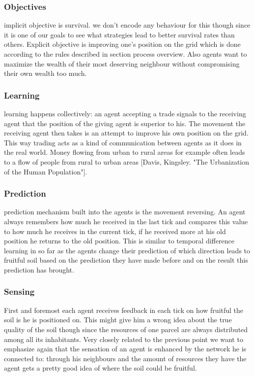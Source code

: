 \documentclass{JASSS}
\begin{document}
\subsubsection{Objectives}
	implicit objective is survival. we don't encode any behaviour for this though since it is one of our goals to see what strategies lead to better survival rates than others. Explicit objective is improving one's position on the grid which is done according to the rules described in section process overview. Also agents want to maximize the wealth of their most deserving neighbour without compromising their own wealth too much.

\subsubsection{Learning}
	learning happens collectively: an agent accepting a trade signals to the receiving agent that the position of the giving agent is superior to his. The movement the receiving agent then takes is an attempt to improve his own position on the grid. This way trading acts as a kind of communication between agents as it does in the real world. Money flowing from urban to rural areas for example often leads to a flow of people from rural to urban areas [Davis, Kingsley. "The Urbanization of the Human Population"].

\subsubsection{Prediction}
	 prediction mechanism built into the agents is the movement reversing. An agent always remembers how much he received in the last tick and compares this value to how much he receives in the current tick, if he received more at his old position he returns to the old position. This is similar to temporal difference learning in so far as the agents change their prediction of which direction leads to fruitful soil based on the prediction they have made before and on the result this prediction has brought.

\subsubsection{Sensing}
	First and foremost each agent receives feedback in each tick on how fruitful the soil is he is positioned on. This might give him a wrong idea about the true quality of the soil though since the resources of one parcel are always distributed among all its inhabitants. Very closely related to the previous point we want to emphasize again that the sensation of an agent is enhanced by the network he is connected to: through his neighbours and the amount of resources they have the agent gets a pretty good idea of where the soil could be fruitful.
\end{document}
